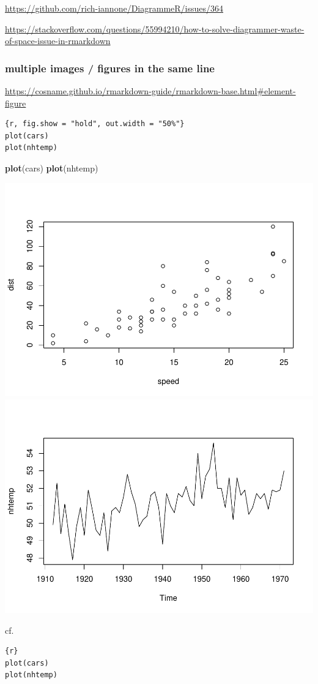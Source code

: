 \documentclass[
]{book}
\newenvironment{Shaded}{\begin{snugshade}}{\end{snugshade}}
\newcommand{\FunctionTok}[1]{\textcolor[rgb]{0.13,0.29,0.53}{\textbf{#1}}}
\newcommand{\NormalTok}[1]{#1}
\theoremstyle{definition}
\theoremstyle{definition}
\theoremstyle{definition}
\theoremstyle{definition}
\theoremstyle{remark}
\begin{document}
\url{https://github.com/rich-iannone/DiagrammeR/issues/364}

\url{https://stackoverflow.com/questions/55994210/how-to-solve-diagrammer-waste-of-space-issue-in-rmarkdown}

\subsubsection{multiple images / figures in the same line}\label{multiple-images-figures-in-the-same-line}

\url{https://cosname.github.io/rmarkdown-guide/rmarkdown-base.html\#element-figure}

\begin{verbatim}
{r, fig.show = "hold", out.width = "50%"}
plot(cars)
plot(nhtemp)
\end{verbatim}

\begin{Shaded}
\begin{Highlighting}[]
\FunctionTok{plot}\NormalTok{(cars)}
\FunctionTok{plot}\NormalTok{(nhtemp)}
\end{Highlighting}
\end{Shaded}

\includegraphics[width=0.5\linewidth]{202401280001-test_files/figure-latex/unnamed-chunk-4-1} \includegraphics[width=0.5\linewidth]{202401280001-test_files/figure-latex/unnamed-chunk-4-2}

cf.

\begin{verbatim}
{r}
plot(cars)
plot(nhtemp)
\end{verbatim}
\end{document}
